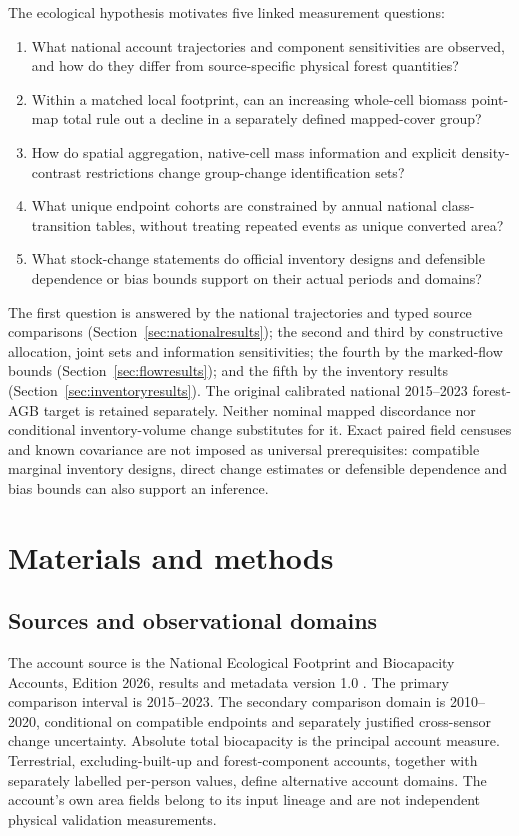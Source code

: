 \documentclass[11pt,a4paper]{article}
\begin{document}
The ecological hypothesis motivates five linked measurement questions:
\begin{enumerate}
\item What national account trajectories and component sensitivities are observed, and how do they differ from source-specific physical forest quantities?
\item Within a matched local footprint, can an increasing whole-cell biomass point-map total rule out a decline in a separately defined mapped-cover group?
\item How do spatial aggregation, native-cell mass information and explicit density-contrast restrictions change group-change identification sets?
\item What unique endpoint cohorts are constrained by annual national class-transition tables, without treating repeated events as unique converted area?
\item What stock-change statements do official inventory designs and defensible dependence or bias bounds support on their actual periods and domains?
\end{enumerate}
The first question is answered by the national trajectories and typed source comparisons (Section~\ref{sec:nationalresults}); the second and third by constructive allocation, joint sets and information sensitivities; the fourth by the marked-flow bounds (Section~\ref{sec:flowresults}); and the fifth by the inventory results (Section~\ref{sec:inventoryresults}). The original calibrated national 2015--2023 forest-AGB target is retained separately. Neither nominal mapped discordance nor conditional inventory-volume change substitutes for it. Exact paired field censuses and known covariance are not imposed as universal prerequisites: compatible marginal inventory designs, direct change estimates or defensible dependence and bias bounds can also support an inference.

\section{Materials and methods}
\subsection{Sources and observational domains}
The account source is the National Ecological Footprint and Biocapacity Accounts, Edition 2026, results and metadata version 1.0 \citep{Lo2026}. The primary comparison interval is 2015--2023. The secondary comparison domain is 2010--2020, conditional on compatible endpoints and separately justified cross-sensor change uncertainty. Absolute total biocapacity is the principal account measure. Terrestrial, excluding-built-up and forest-component accounts, together with separately labelled per-person values, define alternative account domains. The account's own area fields belong to its input lineage and are not independent physical validation measurements.
\end{document}
